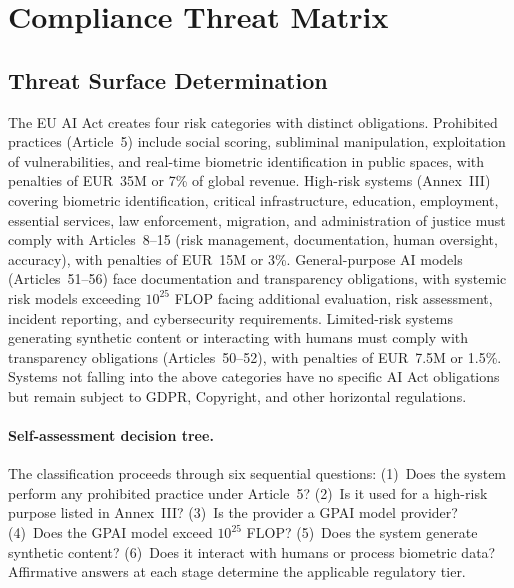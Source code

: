 \documentclass[11pt,a4paper]{article}
\begin{document}
\section{Compliance Threat Matrix}
\label{sec:threat-matrix}

\subsection{Threat Surface Determination}
\label{sec:classification}

The EU AI Act creates four risk categories with distinct obligations. Prohibited practices (Article~5) include social scoring, subliminal manipulation, exploitation of vulnerabilities, and real-time biometric identification in public spaces, with penalties of EUR~35M or 7\% of global revenue. High-risk systems (Annex~III) covering biometric identification, critical infrastructure, education, employment, essential services, law enforcement, migration, and administration of justice must comply with Articles~8--15 (risk management, documentation, human oversight, accuracy), with penalties of EUR~15M or 3\%. General-purpose AI models (Articles~51--56) face documentation and transparency obligations, with systemic risk models exceeding $10^{25}$ FLOP facing additional evaluation, risk assessment, incident reporting, and cybersecurity requirements. Limited-risk systems generating synthetic content or interacting with humans must comply with transparency obligations (Articles~50--52), with penalties of EUR~7.5M or 1.5\%. Systems not falling into the above categories have no specific AI Act obligations but remain subject to GDPR, Copyright, and other horizontal regulations.

\paragraph{Self-assessment decision tree.}
The classification proceeds through six sequential questions: (1)~Does the system perform any prohibited practice under Article~5? (2)~Is it used for a high-risk purpose listed in Annex~III? (3)~Is the provider a GPAI model provider? (4)~Does the GPAI model exceed $10^{25}$ FLOP? (5)~Does the system generate synthetic content? (6)~Does it interact with humans or process biometric data? Affirmative answers at each stage determine the applicable regulatory tier.
\end{document}
